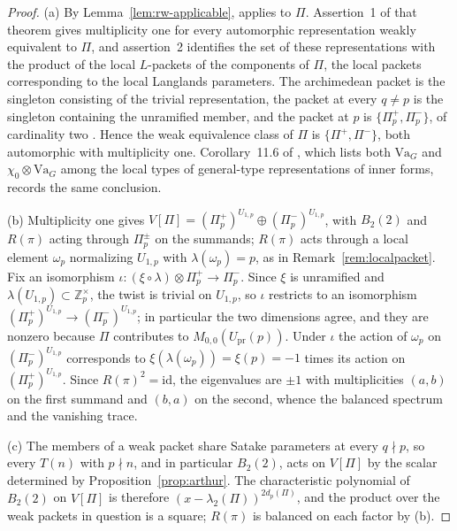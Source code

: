 \documentclass[10pt,a4paper]{amsart}
\newcommand{\Z}{\mathbb{Z}}
\newcommand{\Upr}{U_{\mathrm{pr}}}
\newcommand{\Va}{\mathrm{Va}}
\providecommand{\Upr}{U_{\mathrm{pr}}}
\providecommand{\Va}{\mathrm{Va}}
\begin{document}
	\begin{proof}
		\textup{(a)} By Lemma~\ref{lem:rw-applicable},
		\cite[Thm.~11.4]{RoesnerWeissauer2021} applies to $\Pi$.
		Assertion~1 of that theorem gives multiplicity one for every
		automorphic representation weakly equivalent to $\Pi$, and
		assertion~2 identifies the set of these representations with the
		product of the local $L$-packets of the components of $\Pi$, the
		local packets corresponding to the local Langlands parameters. The
		archimedean packet is the singleton consisting of the trivial
		representation, the packet at every $q\ne p$ is the singleton
		containing the unramified member, and the packet at $p$ is
		$\{\Pi_p^+,\Pi_p^-\}$, of cardinality two
		\cite[Main Thm.~(ii), \S7.2]{GanTantono}. Hence the weak
		equivalence class of $\Pi$ is $\{\Pi^+,\Pi^-\}$, both automorphic
		with multiplicity one. Corollary~11.6 of
		\cite{RoesnerWeissauer2021}, which lists both $\Va_G$ and
		$\chi_0\otimes\Va_G$ among the local types of general-type
		representations of inner forms, records the same conclusion.
		
		\textup{(b)} Multiplicity one gives
		$V[\Pi]=(\Pi_p^+)^{U_{1,p}}\oplus(\Pi_p^-)^{U_{1,p}}$, with
		$B_2(2)$ and $R(\pi)$ acting through $\Pi_p^{\pm}$ on the summands;
		$R(\pi)$ acts through a local element $\omega_p$ normalizing
		$U_{1,p}$ with $\lambda(\omega_p)=p$, as in
		Remark~\ref{rem:localpacket}. Fix an isomorphism
		$\iota\colon(\xi\circ\lambda)\otimes\Pi_p^+\to\Pi_p^-$. Since $\xi$
		is unramified and $\lambda(U_{1,p})\subset\Z_p^\times$, the twist
		is trivial on $U_{1,p}$, so $\iota$ restricts to an isomorphism
		$(\Pi_p^+)^{U_{1,p}}\to(\Pi_p^-)^{U_{1,p}}$; in particular the two
		dimensions agree, and they are nonzero because $\Pi$ contributes to
		$M_{0,0}(\Upr(p))$. Under $\iota$ the action of $\omega_p$ on
		$(\Pi_p^-)^{U_{1,p}}$ corresponds to
		$\xi(\lambda(\omega_p))=\xi(p)=-1$ times its action on
		$(\Pi_p^+)^{U_{1,p}}$. Since $R(\pi)^2=\mathrm{id}$, the
		eigenvalues are $\pm1$ with multiplicities $(a,b)$ on the first
		summand and $(b,a)$ on the second, whence the balanced spectrum and
		the vanishing trace.
		
		\textup{(c)} The members of a weak packet share Satake parameters
		at every $q\nmid p$, so every $T(n)$ with $p\nmid n$, and in
		particular $B_2(2)$, acts on $V[\Pi]$ by the scalar determined by
		Proposition~\ref{prop:arthur}. The characteristic polynomial of
		$B_2(2)$ on $V[\Pi]$ is therefore
		$(x-\lambda_2(\Pi))^{2d_p(\Pi)}$, and the product over the weak
		packets in question is a square; $R(\pi)$ is balanced on each
		factor by \textup{(b)}.
		

\end{proof}
\end{document}
